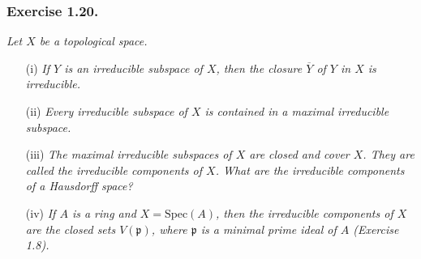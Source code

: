 \documentclass{article}
\begin{document}



\subsubsection*{Exercise 1.20.}
\emph{Let $X$ be a topological space.}
\begin{enumerate}
\item[(i)]
  \emph{If $Y$ is an irreducible subspace of $X$, then the closure $\overline{Y}$
  of $Y$ in $X$ is irreducible.}

\item[(ii)]
  \emph{Every irreducible subspace of $X$ is contained in a maximal irreducible subspace.}

\item[(iii)]
  \emph{The maximal irreducible subspaces of $X$ are closed and cover $X$.
  They are called the irreducible components of $X$.
  What are the irreducible components of a Hausdorff space?}

\item[(iv)]
  \emph{If $A$ is a ring and $X = \mathrm{Spec}(A)$,
  then the irreducible components of $X$ are the closed sets $V(\mathfrak{p})$,
  where $\mathfrak{p}$ is a minimal prime ideal of $A$ (Exercise 1.8).} \\
\end{enumerate}
\end{document}
